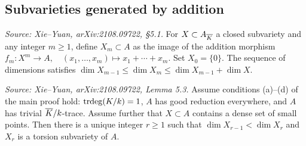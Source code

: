 \subsection{Subvarieties generated by addition}

\begin{definition}
  \label{def:AdditionMap}
  \uses{}
  \textit{Source: Xie--Yuan, arXiv:2108.09722, \S5.1.}
  For \(X \subset A_{\overline{K}}\) a closed subvariety and any integer \(m \geq 1\), define
  \(X_m \subset A\) as the image of the addition morphism
  \(f_m\colon X^m \to A,\quad (x_1,\dots,x_m) \mapsto x_1+\cdots+x_m\).
  Set \(X_0 = \{0\}\).
  The sequence of dimensions satisfies
  \(\dim X_{m-1} \leq \dim X_m \leq \dim X_{m-1} + \dim X\).
\end{definition}

\begin{lemma}
  \label{lem:addition}
  \textit{Source: Xie--Yuan, arXiv:2108.09722, Lemma 5.3.}
  Assume conditions (a)--(d) of the main proof hold: \(\operatorname{trdeg}(K/k)=1\), \(A\) has good
  reduction everywhere, and \(A\) has trivial \(\overline{K}/k\)-trace.
  Assume further that \(X \subset A\) contains a dense set of small points.
  Then there is a unique integer \(r \geq 1\) such that \(\dim X_{r-1} < \dim X_r\) and
  \(X_r\) is a torsion subvariety of \(A\).
\end{lemma}

